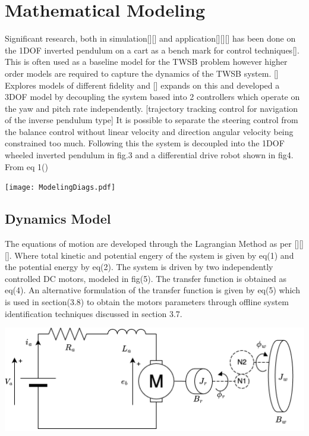   \section{Mathematical Modeling} %
    Significant research, both in simulation[][] and 
    application[][][] has been done on the 1DOF inverted pendulum
    on a cart as a bench mark for control techniques[]. This is often used as a baseline model for the TWSB problem
    however higher order models are required to capture the dynamics of the TWSB system. [] Explores models of different fidelity 
    and [] expands on this and developed a 3DOF model by decoupling the system based into 2 controllers which 
    operate on the yaw and pitch rate independently. [trajectory tracking control for navigation of the inverse pendulum type] 
    It is possible to separate the steering control from the balance control without linear velocity and direction angular velocity being constrained too much.
    Following this the system is decoupled into the 1DOF wheeled inverted pendulum in fig.3 and a differential drive robot shown in fig4.
    From eq 1()

    \texttt{[image: ModelingDiags.pdf]}
    
    \subsection{Dynamics Model}
    The equations of motion are developed through the Lagrangian Method as per [][][]. 
    Where total kinetic and potential engery of the system is given by eq(1) and the potential energy by eq(2).
    The system is driven by two independently controlled DC motors, modeled in fig(5). The transfer function 
    is obtained as eq(4). An alternative formulation of the transfer function is given by eq(5) which is used in section(3.8) 
    to obtain the motors parameters through offline system identification techniques discussed in section 3.7.



    \includegraphics[width=\textwidth]{DCMotorModel.png}

